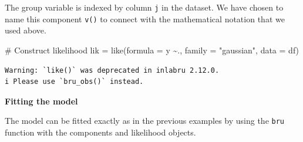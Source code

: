 \documentclass[
  letterpaper,
  DIV=11,
  numbers=noendperiod]{scrartcl}
\newenvironment{Shaded}{\begin{snugshade}}{\end{snugshade}}
\newcommand{\AttributeTok}[1]{\textcolor[rgb]{0.40,0.45,0.13}{#1}}
\newcommand{\CommentTok}[1]{\textcolor[rgb]{0.37,0.37,0.37}{#1}}
\newcommand{\FunctionTok}[1]{\textcolor[rgb]{0.28,0.35,0.67}{#1}}
\newcommand{\NormalTok}[1]{\textcolor[rgb]{0.00,0.23,0.31}{#1}}
\newcommand{\OtherTok}[1]{\textcolor[rgb]{0.00,0.23,0.31}{#1}}
\newcommand{\SpecialCharTok}[1]{\textcolor[rgb]{0.37,0.37,0.37}{#1}}
\newcommand{\StringTok}[1]{\textcolor[rgb]{0.13,0.47,0.30}{#1}}
\begin{document}
The group variable is indexed by column \texttt{j} in the dataset. We
have chosen to name this component \texttt{v()} to connect with the
mathematical notation that we used above.

\begin{Shaded}
\begin{Highlighting}[]
\CommentTok{\# Construct likelihood}
\NormalTok{lik }\OtherTok{=}  \FunctionTok{like}\NormalTok{(}\AttributeTok{formula =}\NormalTok{ y }\SpecialCharTok{\textasciitilde{}}\NormalTok{.,}
            \AttributeTok{family =} \StringTok{"gaussian"}\NormalTok{,}
            \AttributeTok{data =}\NormalTok{ df)}
\end{Highlighting}
\end{Shaded}

\begin{verbatim}
Warning: `like()` was deprecated in inlabru 2.12.0.
i Please use `bru_obs()` instead.
\end{verbatim}

\textbf{Fitting the model}

The model can be fitted exactly as in the previous examples by using the
\texttt{bru} function with the components and likelihood objects.
\end{document}
